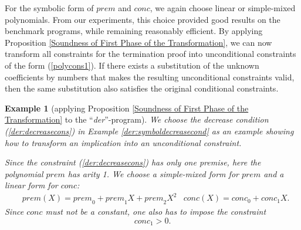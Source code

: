 \documentclass[envcountsame]{tlp}
\newcounter{polycons2ctr}
\newcounter{polycons1ctr}
\newcounter{ex:der-lastsymconsctr}
\newtheorem{example}{Example}
\begin{document}
For the symbolic form of $\mathit{prem}$ and
$\mathit{conc}$, we again choose linear
or simple-mixed  polynomials. 
From our experiments, this choice
provided good results on the benchmark programs, while remaining reasonably 
efficient. 
By applying Proposition \ref{Soundness of First Phase of the Transformation},
we can now transform all constraints for the termination proof into unconditional constraints
of the form (\ref{polycons1}). If there exists a substitution of the unknown
coefficients by numbers that makes the resulting unconditional constraints valid,
then the same substitution also satisfies the original conditional constraints.

\begin{example}[applying Proposition \ref{Soundness of First Phase of the
Transformation} to the  ``\textit{der}''-program] 
\label{ex-der:sym_cons} 
We choose the decrease
condition (\ref{der:decreasecons})
in Example \ref{der:symboldecreasecond}
as an example showing how
to transform an implication 
into an unconditional constraint. 

Since the constraint (\ref{der:decreasecons}) has only one premise, here the
polynomial $\mathit{prem}$ has arity 1. We
choose a simple-mixed form for $\mathit{prem}$ and a linear form for 
$\mathit{conc}$:
\begin{align*}
    & \mathit{prem}(X) = \mathit{prem}_0 + \mathit{prem}_1X+\mathit{prem}_2X^2
    & \mathit{conc}(X)   = \mathit{conc}_0 + \mathit{conc}_1X.
\end{align*}
Since $\mathit{conc}$ must not be a constant, one also has to impose the constraint
            \[  \mathit{conc}_1 > 0.  \]


\end{example}
\end{document}
